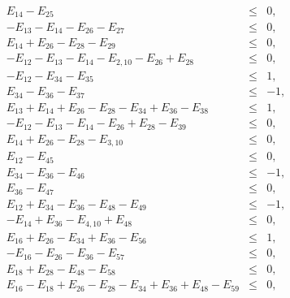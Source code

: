 \documentclass[%
  twocolumn,
 showpacs,
 showkeys,
 preprintnumbers,
 amsmath,amssymb,
 aps,
  pra,
  longbibliography,
 floatfix,
 ]{revtex4-1}
\begin{document}
\begin{eqnarray}
 E_{14} - E_{25} &\le&  0,                                                                                   \\
-E_{13} - E_{14} - E_{26} - E_{27} &\le&  0,                                                                 \\
 E_{14} + E_{26} - E_{28} - E_{29} &\le&  0,                                                                 \\
-E_{12} - E_{13} - E_{14} - E_{2,10} - E_{26} + E_{28} &\le&    0,                                           \\
-E_{12} - E_{34} - E_{35} &\le&  1,                                                                          \\
 E_{34} - E_{36} - E_{37} &\le&  -1,                                                                         \\
 E_{13} + E_{14} + E_{26} - E_{28} - E_{34} + E_{36} - E_{38} &\le&   1,                                     \\
-E_{12} - E_{13} - E_{14} - E_{26} + E_{28} - E_{39} &\le&  0,                                               \\
 E_{14} + E_{26} - E_{28} - E_{3,10} &\le&  0,                                                               \\
 E_{12} - E_{45} &\le&  0,                                                                                   \\
 E_{34} - E_{36} - E_{46} &\le&  -1,                                                                         \\
 E_{36} - E_{47} &\le&  0,                                                                                   \\
 E_{12} + E_{34} - E_{36} - E_{48} - E_{49} &\le&  -1,                                                       \\
-E_{14} + E_{36} - E_{4,10} + E_{48} &\le&  0,                                                               \\
 E_{16} + E_{26} - E_{34} + E_{36} - E_{56} &\le&  1,                                                        \\
-E_{16} - E_{26} - E_{36} - E_{57} &\le&  0,                                                                 \\
 E_{18} + E_{28} - E_{48} - E_{58} &\le&  0,                                                                 \\
 E_{16} - E_{18} + E_{26} - E_{28} - E_{34} + E_{36} + E_{48} - E_{59} &\le&   0,                            \\

\end{eqnarray}
\end{document}
